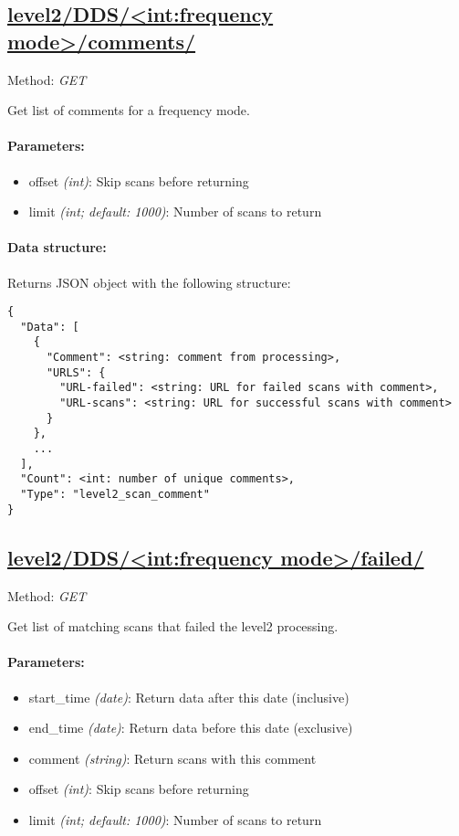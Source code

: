 \subsection{\url{level2/DDS/<int:frequency mode>/comments/}}
Method: \emph{GET}

Get list of comments for a frequency mode.

\paragraph{Parameters:}
\begin{itemize}
    \item offset \emph{(int)}: Skip scans before returning
    \item limit \emph{(int; default: 1000)}: Number of scans to return
\end{itemize}

\paragraph{Data structure:}
Returns JSON object with the following structure:

\begin{lstlisting}[basicstyle=\footnotesize]
{
  "Data": [
    {
      "Comment": <string: comment from processing>,
      "URLS": {
        "URL-failed": <string: URL for failed scans with comment>,
        "URL-scans": <string: URL for successful scans with comment>
      }
    },
    ...
  ],
  "Count": <int: number of unique comments>,
  "Type": "level2_scan_comment"
}
\end{lstlisting}


\subsection{\url{level2/DDS/<int:frequency mode>/failed/}}
Method: \emph{GET}

Get list of matching scans that failed the level2 processing.

\paragraph{Parameters:}
\begin{itemize}
    \item start\_time \emph{(date)}: Return data after this date (inclusive)
    \item end\_time \emph{(date)}: Return data before this date (exclusive)
    \item comment \emph{(string)}: Return scans with this comment
    \item offset \emph{(int)}: Skip scans before returning
    \item limit \emph{(int; default: 1000)}: Number of scans to return
\end{itemize}

